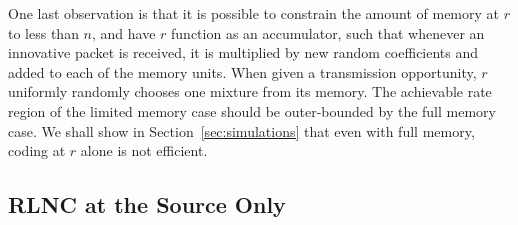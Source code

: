 \documentclass[journal, letterpaper]{IEEEtran}
\begin{document}
One last observation is that it is possible to constrain the amount of memory at $r$ to less than $n$, and have $r$ function as an accumulator, such that whenever an innovative packet is received, it is multiplied by new random coefficients and added to each of the memory units. When given a transmission opportunity, $r$ uniformly randomly chooses one mixture from its memory. The achievable rate region of the limited memory case should be outer-bounded by the full memory case. We shall show in Section~\ref{sec:simulations} that even with full memory, coding at $r$ alone is not efficient.




\subsection{RLNC at the Source Only}\label{subsec:s}
\end{document}
